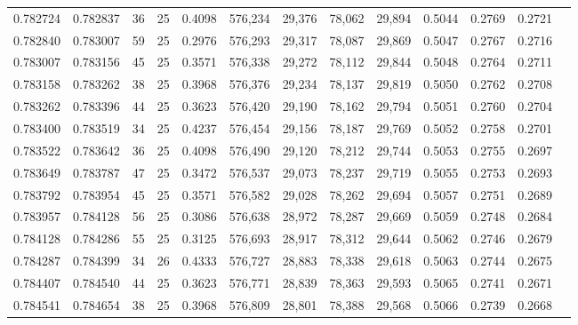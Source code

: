 \begin{tabular}{rrrrrrrrrrrrr}
0.782724 & 0.782837 &    36 &  25 &                                     0.4098 & 576,234 &  29,376 &  78,062 &  29,894 & 0.5044 & 0.2769 & 0.2721 \\
0.782840 & 0.783007 &    59 &  25 &                                     0.2976 & 576,293 &  29,317 &  78,087 &  29,869 & 0.5047 & 0.2767 & 0.2716 \\
0.783007 & 0.783156 &    45 &  25 &                                     0.3571 & 576,338 &  29,272 &  78,112 &  29,844 & 0.5048 & 0.2764 & 0.2711 \\
0.783158 & 0.783262 &    38 &  25 &                                     0.3968 & 576,376 &  29,234 &  78,137 &  29,819 & 0.5050 & 0.2762 & 0.2708 \\
0.783262 & 0.783396 &    44 &  25 &                                     0.3623 & 576,420 &  29,190 &  78,162 &  29,794 & 0.5051 & 0.2760 & 0.2704 \\
0.783400 & 0.783519 &    34 &  25 &                                     0.4237 & 576,454 &  29,156 &  78,187 &  29,769 & 0.5052 & 0.2758 & 0.2701 \\
0.783522 & 0.783642 &    36 &  25 &                                     0.4098 & 576,490 &  29,120 &  78,212 &  29,744 & 0.5053 & 0.2755 & 0.2697 \\
0.783649 & 0.783787 &    47 &  25 &                                     0.3472 & 576,537 &  29,073 &  78,237 &  29,719 & 0.5055 & 0.2753 & 0.2693 \\
0.783792 & 0.783954 &    45 &  25 &                                     0.3571 & 576,582 &  29,028 &  78,262 &  29,694 & 0.5057 & 0.2751 & 0.2689 \\
0.783957 & 0.784128 &    56 &  25 &                                     0.3086 & 576,638 &  28,972 &  78,287 &  29,669 & 0.5059 & 0.2748 & 0.2684 \\
0.784128 & 0.784286 &    55 &  25 &                                     0.3125 & 576,693 &  28,917 &  78,312 &  29,644 & 0.5062 & 0.2746 & 0.2679 \\
0.784287 & 0.784399 &    34 &  26 &                                     0.4333 & 576,727 &  28,883 &  78,338 &  29,618 & 0.5063 & 0.2744 & 0.2675 \\
0.784407 & 0.784540 &    44 &  25 &                                     0.3623 & 576,771 &  28,839 &  78,363 &  29,593 & 0.5065 & 0.2741 & 0.2671 \\
0.784541 & 0.784654 &    38 &  25 &                                     0.3968 & 576,809 &  28,801 &  78,388 &  29,568 & 0.5066 & 0.2739 & 0.2668 \\

\end{tabular}

